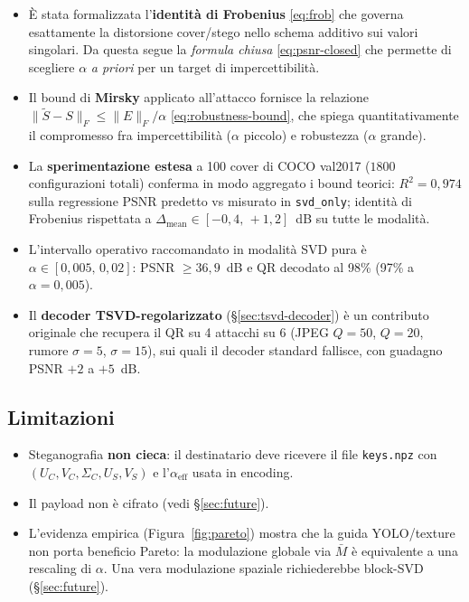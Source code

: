 \documentclass[11pt,a4paper]{article}
\theoremstyle{definition}
\theoremstyle{remark}
\begin{document}
\begin{itemize}[leftmargin=*,itemsep=2pt]
  \item È stata formalizzata l'\textbf{identità di Frobenius}
        \eqref{eq:frob} che governa esattamente la distorsione cover/stego
        nello schema additivo sui valori singolari.  Da questa segue la
        \emph{formula chiusa} \eqref{eq:psnr-closed} che permette di
        scegliere $\alpha$ \emph{a priori} per un target di
        impercettibilità.
  \item Il bound di \textbf{Mirsky} applicato all'attacco fornisce la
        relazione $\|\widetilde S - S\|_F \leq \|E\|_F/\alpha$
        \eqref{eq:robustness-bound}, che spiega quantitativamente il
        compromesso fra impercettibilità ($\alpha$ piccolo) e robustezza
        ($\alpha$ grande).
  \item La \textbf{sperimentazione estesa} a 100 cover di COCO val2017
        ($1800$ configurazioni totali) conferma in modo aggregato i
        bound teorici: $R^{2} = 0{,}974$ sulla regressione PSNR
        predetto vs misurato in \verb|svd_only|; identit\`a di
        Frobenius rispettata a $\Delta_{\text{mean}}\in [-0{,}4,\,+1{,}2]$~dB
        su tutte le modalit\`a.
  \item L'intervallo operativo raccomandato in modalit\`a SVD pura \`e
        $\alpha\in[0{,}005,\,0{,}02]$: PSNR $\geq 36{,}9$~dB e QR
        decodato al 98\% (97\% a $\alpha=0{,}005$).
  \item Il \textbf{decoder TSVD-regolarizzato} (\S\ref{sec:tsvd-decoder})
        \`e un contributo originale che recupera il QR su 4 attacchi
        su 6 (JPEG $Q=50$, $Q=20$, rumore $\sigma=5$, $\sigma=15$),
        sui quali il decoder standard fallisce, con guadagno PSNR
        $+2$ a $+5$~dB.
\end{itemize}

\subsection{Limitazioni}

\begin{itemize}[leftmargin=*,itemsep=2pt]
  \item Steganografia \textbf{non cieca}: il destinatario deve
        ricevere il file \verb|keys.npz| con $(U_C, V_C, \Sigma_C, U_S, V_S)$
        e l'$\alpha_{\text{eff}}$ usata in encoding.
  \item Il payload non \`e cifrato (vedi §\ref{sec:future}).
  \item L'evidenza empirica (Figura~\ref{fig:pareto}) mostra che la
        guida YOLO/texture non porta beneficio Pareto: la modulazione
        globale via $\bar M$ \`e equivalente a una rescaling di
        $\alpha$.  Una vera modulazione spaziale richiederebbe
        block-SVD (\S\ref{sec:future}).
\end{itemize}
\end{document}
